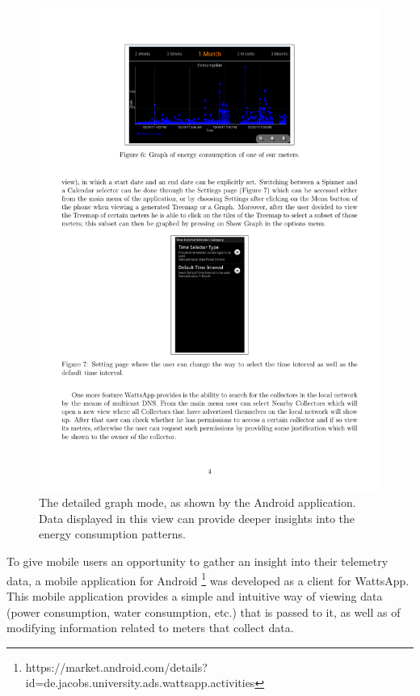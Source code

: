 \documentclass[10pt, conference, compsocconf, english]{IEEEtran}
\begin{document}
\begin{figure}[t]
\begin{centering}
\includegraphics[scale=0.78]{images/mobile-graph} 
\par\end{centering}

\caption{The detailed graph mode, as shown by the Android application. Data
displayed in this view can provide deeper insights into the energy
consumption patterns.\label{fig:graph-android}}
\end{figure}


To give mobile users an opportunity to gather an insight into their
telemetry data, a mobile application for Android%
\footnote{https://market.android.com/details?id=de.jacobs.university.ads.wattsapp.activities%
} was developed as a client for WattsApp. This mobile application provides
a simple and intuitive way of viewing data (power consumption, water
consumption, etc.) that is passed to it, as well as of modifying information
related to meters that collect data.
\end{document}

